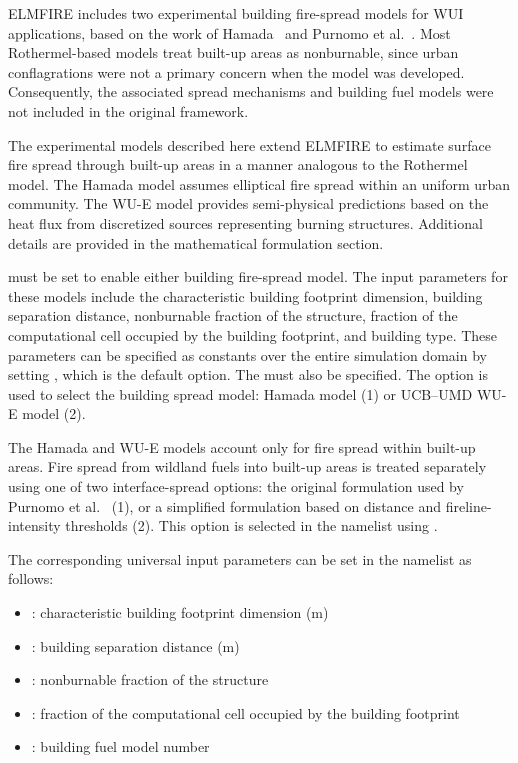 ELMFIRE includes two experimental building fire-spread models for WUI applications, based on the work of Hamada~\cite{hamadaRateFireSpread1951} and Purnomo et al.~\cite{purnomoReconstructingModesDestruction2024}. Most Rothermel-based models treat built-up areas as nonburnable, since urban conflagrations were not a primary concern when the model was developed. Consequently, the associated spread mechanisms and building fuel models were not included in the original framework.

The experimental models described here extend ELMFIRE to estimate surface fire spread through built-up areas in a manner analogous to the Rothermel model. The Hamada model assumes elliptical fire spread within an uniform urban community. The WU-E model provides semi-physical predictions based on the heat flux from discretized sources representing burning structures. Additional details are provided in the mathematical formulation section.

 must be set to enable either building fire-spread model. The input parameters for these models include the characteristic building footprint dimension, building separation distance, nonburnable fraction of the structure, fraction of the computational cell occupied by the building footprint, and building type. These parameters can be specified as constants over the entire simulation domain by setting , which is the default option. The  must also be specified. The  option is used to select the building spread model: Hamada model (1) or UCB--UMD WU-E model (2).

The Hamada and WU-E models account only for fire spread within built-up areas. Fire spread from wildland fuels into built-up areas is treated separately using one of two interface-spread options: the original formulation used by Purnomo et al.~\cite{purnomoReconstructingModesDestruction2024} (1), or a simplified formulation based on distance and fireline-intensity thresholds (2). This option is selected in the  namelist using .

The corresponding universal input parameters can be set in the  namelist as follows:

\begin{itemize}
    \item {}: characteristic building footprint dimension ($\mathrm{m}$)
    \item {}: building separation distance ($\mathrm{m}$)
    \item {}: nonburnable fraction of the structure
    \item {}: fraction of the computational cell occupied by the building footprint
    \item {}: building fuel model number
\end{itemize}

